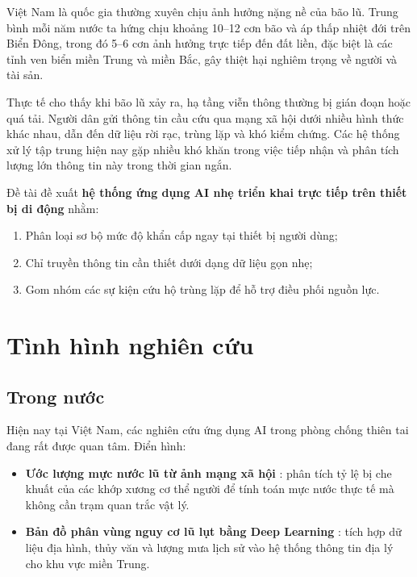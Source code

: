 \documentclass[12pt, a4paper]{report}
\newcommand{\keyword}[1]{\textbf{#1}}
\begin{document}
Việt Nam là quốc gia thường xuyên chịu ảnh hưởng nặng nề của bão lũ. Trung bình mỗi năm nước ta hứng chịu khoảng 10--12 cơn bão và áp thấp nhiệt đới trên Biển Đông, trong đó 5--6 cơn ảnh hưởng trực tiếp đến đất liền, đặc biệt là các tỉnh ven biển miền Trung và miền Bắc, gây thiệt hại nghiêm trọng về người và tài sản.

Thực tế cho thấy khi bão lũ xảy ra, hạ tầng viễn thông thường bị gián đoạn hoặc quá tải. Người dân gửi thông tin cầu cứu qua mạng xã hội dưới nhiều hình thức khác nhau, dẫn đến dữ liệu rời rạc, trùng lặp và khó kiểm chứng. Các hệ thống xử lý tập trung hiện nay gặp nhiều khó khăn trong việc tiếp nhận và phân tích lượng lớn thông tin này trong thời gian ngắn.

Đề tài đề xuất \keyword{hệ thống ứng dụng AI nhẹ triển khai trực tiếp trên thiết bị di động} nhằm:
\begin{enumerate}[leftmargin=1.5cm]
  \item Phân loại sơ bộ mức độ khẩn cấp ngay tại thiết bị người dùng;
  \item Chỉ truyền thông tin cần thiết dưới dạng dữ liệu gọn nhẹ;
  \item Gom nhóm các sự kiện cứu hộ trùng lặp để hỗ trợ điều phối nguồn lực.
\end{enumerate}

\section{Tình hình nghiên cứu}

\subsection{Trong nước}

Hiện nay tại Việt Nam, các nghiên cứu ứng dụng AI trong phòng chống thiên tai đang rất được quan tâm. Điển hình:

\begin{itemize}
  \item \textbf{Ước lượng mực nước lũ từ ảnh mạng xã hội} \cite{quan2020flood}: phân tích tỷ lệ bị che khuất của các khớp xương cơ thể người để tính toán mực nước thực tế mà không cần trạm quan trắc vật lý.
  \item \textbf{Bản đồ phân vùng nguy cơ lũ lụt bằng Deep Learning} \cite{nguyen2022flood}: tích hợp dữ liệu địa hình, thủy văn và lượng mưa lịch sử vào hệ thống thông tin địa lý cho khu vực miền Trung.
\end{itemize}
\end{document}
